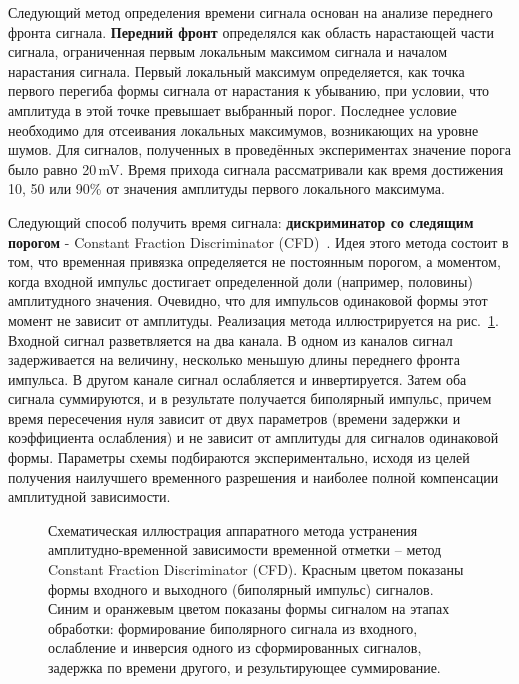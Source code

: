 Следующий метод определения времени сигнала основан на анализе переднего фронта сигнала. \textbf{Передний фронт} определялся как область нарастающей части сигнала, ограниченная первым локальным максимом сигнала и началом нарастания сигнала. Первый локальный максимум определяется, как точка первого перегиба формы сигнала от нарастания к убыванию, при условии, что амплитуда в этой точке превышает выбранный порог. Последнее условие необходимо для отсеивания локальных максимумов, возникающих на уровне шумов. Для сигналов, полученных в проведённых экспериментах значение порога было равно 20\,mV. 
Время прихода сигнала рассматривали как время достижения 10, 50 или 90\% от значения амплитуды первого локального максимума.

Следующий способ получить время сигнала: \textbf{дискриминатор со следящим порогом} - Constant Fraction Discriminator (CFD)~\cite{methods}. Идея этого метода состоит в том, что временная привязка определяется не постоянным порогом, а моментом, когда входной импульс достигает определенной доли (например, половины) амплитудного значения. Очевидно, что для импульсов одинаковой формы этот момент не зависит от амплитуды.
Реализация метода иллюстрируется на рис.~\ref{ris:cfd}.
Входной сигнал разветвляется на два канала. В одном из каналов сигнал задерживается на величину, несколько меньшую длины переднего фронта импульса. В другом канале сигнал ослабляется и инвертируется. Затем оба сигнала суммируются, и в результате получается биполярный импульс, причем время пересечения нуля зависит от двух параметров (времени задержки и коэффициента ослабления) и не зависит от амплитуды для сигналов одинаковой формы. Параметры схемы подбираются экспериментально, исходя из целей получения наилучшего временного разрешения и наиболее полной компенсации амплитудной зависимости.

\begin{figure}[!t]
	\caption{ Схематическая иллюстрация аппаратного метода устранения амплитудно-временной зависимости временной отметки – метод Constant Fraction Discriminator (CFD).  Красным цветом показаны формы входного и выходного (биполярный импульс) сигналов. Синим и оранжевым цветом показаны формы сигналом на этапах обработки: формирование биполярного сигнала из входного, ослабление и инверсия одного из сформированных сигналов,  задержка по времени другого, и результирующее суммирование.}
	\label{ris:cfd}
\end{figure}

